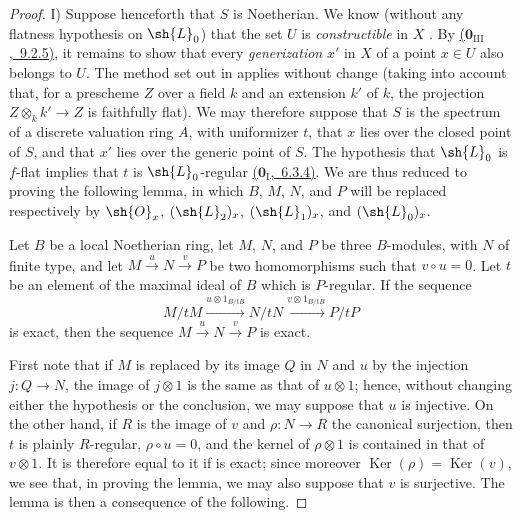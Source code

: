\begin{proof}
\medskip
I) Suppose henceforth that $S$ is Noetherian.
We know (without any flatness hypothesis on $\sh{L}_0$) that the set $U$ is \emph{constructible} in $X$ .
By \hyperref[0.9.2.5]{($\mathbf{0}_{\mathrm{III}}$,~9.2.5)}, it remains to show that every \emph{generization} $x'$ in $X$ of a point $x\in U$ also belongs to $U$.
The method set out in  applies without change (taking into account that, for a prescheme $Z$ over a field $k$ and an extension $k'$ of $k$, the projection $Z\otimes_k k'\to Z$ is faithfully flat).
We may therefore suppose that $S$ is the spectrum of a discrete valuation ring $A$, with uniformizer $t$, that $x$ lies over the closed point of $S$, and that $x'$ lies over the generic point of $S$.
The hypothesis that $\sh{L}_0$ is $f$-flat implies that $t$ is $\sh{L}_0$-regular \hyperref[0.6.3.4]{($\mathbf{0}_{\mathrm{I}}$,~6.3.4)}.
We are thus reduced to proving the following lemma, in which $B$, $M$, $N$, and $P$ will be replaced respectively by $\sh{O}_x$, $(\sh{L}_2)_x$, $(\sh{L}_1)_x$, and $(\sh{L}_0)_x$.

\begin{lemma}[12.3.3.1]
\label{IV.12.3.3.1}
Let $B$ be a local Noetherian ring, let $M$, $N$, and $P$ be three $B$-modules, with $N$ of finite type, and let
$M\xrightarrow{u}N\xrightarrow{v}P$ be two homomorphisms such that $v\circ u=0$.
Let $t$ be an element of the maximal ideal of $B$ which is $P$-regular.
If the sequence
\begin{equation}
\tag{12.3.3.2}
\label{IV.12.3.3.2}
M/tM \xrightarrow{u\otimes 1_{B/tB}} N/tN \xrightarrow{v\otimes 1_{B/tB}} P/tP
\end{equation}
is exact, then the sequence $M\xrightarrow{u}N\xrightarrow{v}P$ is exact.
\end{lemma}

First note that if $M$ is replaced by its image $Q$ in $N$ and $u$ by the injection $j:Q\to N$, the image of $j\otimes 1$ is the same as that of $u\otimes 1$; hence, without changing either the hypothesis or the conclusion, we may suppose that $u$ is injective.
On the other hand, if $R$ is the image of $v$ and $\rho:N\to R$ the canonical surjection, then $t$ is plainly $R$-regular, $\rho\circ u=0$, and the kernel of $\rho\otimes 1$ is contained in that of $v\otimes 1$.
It is therefore equal to it if  is exact; since moreover $\operatorname{Ker}(\rho)=\operatorname{Ker}(v)$, we see that, in proving the lemma, we may also suppose that $v$ is surjective.
The lemma is then a consequence of the following.


\end{proof}
